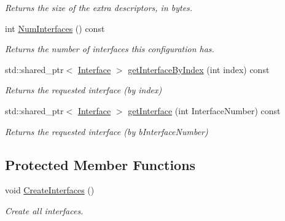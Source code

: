 \begin{DoxyCompactItemize}
\begin{DoxyCompactList}\small\item\em Returns the size of the extra descriptors, in bytes. \end{DoxyCompactList}\item 
\hypertarget{class_lib_u_s_b_1_1_configuration_impl_af7ea2860cb4e707d20fd9de06ed18d22}{int \hyperlink{class_lib_u_s_b_1_1_configuration_impl_af7ea2860cb4e707d20fd9de06ed18d22}{Num\-Interfaces} () const }\label{class_lib_u_s_b_1_1_configuration_impl_af7ea2860cb4e707d20fd9de06ed18d22}

\begin{DoxyCompactList}\small\item\em Returns the number of interfaces this configuration has. \end{DoxyCompactList}\item 
std\-::shared\-\_\-ptr$<$ \hyperlink{class_lib_u_s_b_1_1_interface}{Interface} $>$ \hyperlink{class_lib_u_s_b_1_1_configuration_impl_a181693d8f225cf8020888bbf8984f670}{get\-Interface\-By\-Index} (int index) const 
\begin{DoxyCompactList}\small\item\em Returns the requested interface (by index) \end{DoxyCompactList}\item 
\hypertarget{class_lib_u_s_b_1_1_configuration_impl_aa4e714a3d0c5ca0465840b35e59d2d34}{std\-::shared\-\_\-ptr$<$ \hyperlink{class_lib_u_s_b_1_1_interface}{Interface} $>$ \hyperlink{class_lib_u_s_b_1_1_configuration_impl_aa4e714a3d0c5ca0465840b35e59d2d34}{get\-Interface} (int Interface\-Number) const }\label{class_lib_u_s_b_1_1_configuration_impl_aa4e714a3d0c5ca0465840b35e59d2d34}

\begin{DoxyCompactList}\small\item\em Returns the requested interface (by b\-Interface\-Number) \end{DoxyCompactList}\end{DoxyCompactItemize}
\subsection*{Protected Member Functions}
\begin{DoxyCompactItemize}
\item 
\hypertarget{class_lib_u_s_b_1_1_configuration_impl_ad5f1677bc19772fed0c1b5e7ac88421f}{void \hyperlink{class_lib_u_s_b_1_1_configuration_impl_ad5f1677bc19772fed0c1b5e7ac88421f}{Create\-Interfaces} ()}\label{class_lib_u_s_b_1_1_configuration_impl_ad5f1677bc19772fed0c1b5e7ac88421f}

\begin{DoxyCompactList}\small\item\em Create all interfaces. \end{DoxyCompactList}\end{DoxyCompactItemize}


